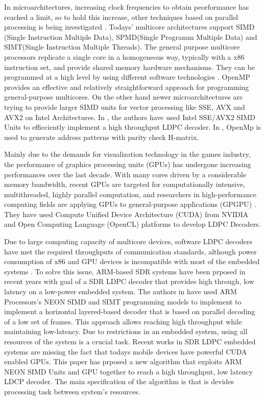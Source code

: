 \documentclass[conference]{IEEEtran}
\begin{document}
In microarchitectures, increasing clock frequencies to obtain peorformance has reached a limit, so to hold this increase, other techniques based on parallel processing is being investigated \cite{art_ldpc_cpu1}. Todays' multicore architectures support SIMD (Single Instruction Multiple Data), SPMD(Single Programm Multiple Data) and SIMT(Single Instruction Multiple Threads). The general purpose multicore processors replicate a single core in a homogeneous way, typically with a x86 instruction set, and provide shared memory hardware mechanisms\cite{art_massively}. They can be programmed at a high level by using different software technologies \cite{art_multicore_techs}. OpenMP \cite{art_openMp_book} provides an effective and relatively straightforward approach for programming general-purpose multicores. On the other hand newer microarchitectures are trying to provide larger SIMD units for vector processing like SSE, AVX and AVX2 \cite{art_intel_sse} on Intel Architectures. In \cite{art_ldpc_cpu1}, the authors have used Intel SSE/AVX2 SIMD Units to effieciently implement a high throughput LDPC decoder. In \cite{art_cuda_openmp}, OpenMp is used to generate address patterns with parity check H-matrix.

Mainly due to the demands for visualization technology in the games industry, the performance of graphics processing units (GPUs) has undergone increasing performances over the last decade. With many cores driven by a considerable memory bandwidth, recent GPUs are targeted for computationally intensive, multithreaded, highly parallel computation, and researchers in high-performance computing fields are applying GPUs to general-purpose applications (GPGPU) \cite{art_gpu_0,art_cuda_openmp, art_memory_coalesced, art_ldpc_OpenCl, art_optimize_0, art_layered1}. They have used Compute Unified Device Architecture (CUDA)
from NVIDIA \cite{website_cuda} and Open Computing Language (OpenCL) platforms to develop LDPC Decoders.

Due to large computing capacity of multicore devices, software LDPC decoders have met the required throughputs of communication standards, although power consumption of x86 and GPU devices is incompatible with most of the embedded systems \cite{art_neon}. To solve this issue, ARM-based SDR systems have been prposed in recent years \cite{art_neon, art_ldpc_cpu0, art_ldpc_OpenCl_1} with goal of a SDR LDPC decoder that provides high through, low latency on a low-power embedded system. The authors in \cite{art_neon} have used ARM Processors's NEON SIMD and SIMT programming models to implement to implement a horizontal layered-based decoder that is based on parallel decoding of a low set of frames. This approach allows reaching high throughput while maintaining low-latency. Due to restrictions in an embedded system, using all resources of the system is a crucial task. Recent works in SDR LDPC embedded systems are missing the fact that todays mobile devices have powerful CUDA enabled GPUs. This paper has prposed a new algorithm that exploits ARM NEON SIMD Units and GPU together to reach a high throughput, low latency LDCP decoder. The main specification of the algorithm is that is devides processing task between system's resources. 
\end{document}
